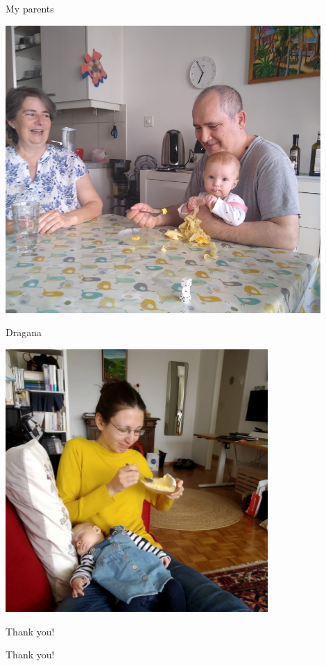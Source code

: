 \documentclass[10pt]{beamer}
\newenvironment{slide}[2][]
  {\begin{frame}[fragile,environment=slide,#1]{#2}}
  {\end{frame}}
\begin{document}
\begin{slide}{My parents}
\begin{center}
\includegraphics[width=0.9\textwidth]{figures/parents.jpg}
\end{center}
\end{slide}

\begin{slide}{Dragana}
\begin{center}
\includegraphics[width=0.75\textwidth]{figures/dragana.jpg}
\end{center}
\end{slide}

\begin{slide}{Thank you!}
\begin{center}
\Huge Thank you!
\end{center}
\end{slide}
\end{document}

